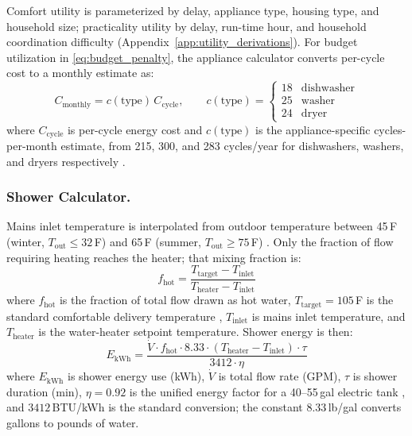 \documentclass[final,3p,times]{elsarticle}
\begin{document}
Comfort utility is parameterized by delay, appliance type, housing type, and household size; practicality utility by delay, run-time hour, and household coordination difficulty (Appendix~\ref{app:utility_derivations}).
For budget utilization in \eqref{eq:budget_penalty}, the appliance calculator converts per-cycle cost to a monthly estimate as:
\begin{equation}
  C_{\mathrm{monthly}} = c(\mathrm{type})\,C_{\mathrm{cycle}}, \qquad
  c(\mathrm{type})=
  \begin{cases}
    18 & \text{dishwasher} \\[2pt]
    25 & \text{washer} \\[2pt]
    24 & \text{dryer}
  \end{cases}
  \label{eq:appliance_monthly_cost}
\end{equation}
\noindent where $C_{\mathrm{cycle}}$ is per-cycle energy cost and $c(\mathrm{type})$ is the appliance-specific cycles-per-month estimate, from 215, 300, and 283 cycles/year for dishwashers, washers, and dryers respectively \cite{energystar_dishwasher_criteria2023,energystar_clotheswasher,doe_dryer_tp_2011}.

\subsubsection{Shower Calculator.}
Mains inlet temperature is interpolated from outdoor temperature between 45\,\textdegree{}F (winter, $T_{\mathrm{out}} \le 32$\,\textdegree{}F) and 65\,\textdegree{}F (summer, $T_{\mathrm{out}} \ge 75$\,\textdegree{}F) \cite{hendron2008,backman2013}. Only the fraction of flow requiring heating reaches the heater; that mixing fraction is:
\begin{equation}
  f_{\mathrm{hot}} = \frac{T_{\mathrm{target}} - T_{\mathrm{inlet}}}
                          {T_{\mathrm{heater}} - T_{\mathrm{inlet}}}
  \label{eq:shower_fraction}
\end{equation}
\noindent where $f_{\mathrm{hot}}$ is the fraction of total flow drawn as hot water, $T_{\mathrm{target}} = 105$\,\textdegree{}F is the standard comfortable delivery temperature \cite{zhang2023}, $T_{\mathrm{inlet}}$ is mains inlet temperature, and $T_{\mathrm{heater}}$ is the water-heater setpoint temperature. Shower energy is then:
\begin{equation}
  E_{\mathrm{kWh}} = \frac{\dot{V} \cdot f_{\mathrm{hot}} \cdot 8.33 \cdot
                            (T_{\mathrm{heater}} - T_{\mathrm{inlet}}) \cdot \tau}
                          {3412 \cdot \eta}
  \label{eq:shower_energy}
\end{equation}
\noindent where $E_{\mathrm{kWh}}$ is shower energy use (kWh), $\dot{V}$ is total flow rate (GPM), $\tau$ is shower duration (min), $\eta = 0.92$ is the unified energy factor for a 40--55\,gal electric tank \cite{rheem2025}, and $3412$\,BTU/kWh is the standard conversion; the constant $8.33$\,lb/gal converts gallons to pounds of water.
\end{document}
